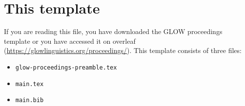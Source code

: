 




\newcommand{\fulltitle}{GLOW proceedings template}
\newcommand{\shorttitle}{GLOW proceedings template}
\newcommand{\authorlast}{Lastname}


\author{%
    Firstname Lastname \\
    University of Overleaf\\
}

\usepackage[newfloat]{minted}

\usepackage{tikz}
\usetikzlibrary{arrows.meta}
\usepackage[linguistics]{forest}



\maketitle
\thispagestyle{titlepage}
\pagestyle{scrheadings}

\begin{abstract}
    \noindent\textbf{Abstract:} This document decribes the GLOW proceedings
    style guide and provides some guidance for using it in \LaTeX{}. You can
    simply make a copy of the file \texttt{main.tex} and use it to write your
    GLOW proceedings paper.\\

    \noindent\textbf{Keywords:} \emph{keyword 1}, \emph{keyword 2}, \emph{keyword 3}
\end{abstract}

\section{This template}

If you are reading this file, you have downloaded the GLOW proceedings template
or you have accessed it on overleaf (\url{https://glowlinguistics.org/proceedings/}). This template consists of three files:

\begin{itemize}
    \item \texttt{glow-proceedings-preamble.tex}
    \item \texttt{main.tex}
    \item \texttt{main.bib}
\end{itemize}

